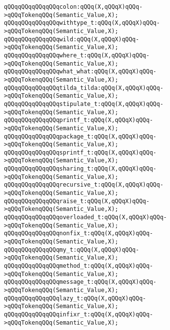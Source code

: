 \verb|qQQqqQQqqQQqqQQqcolon:qQQq(X,qQQqX)qQQq->qQQqTokenqQQq(Semantic_Value,X);|\newline
\verb|qQQqqQQqqQQqqQQqwithtype_t:qQQq(X,qQQqX)qQQq->qQQqTokenqQQq(Semantic_Value,X);|\newline
\verb|qQQqqQQqqQQqqQQqwild:qQQq(X,qQQqX)qQQq->qQQqTokenqQQq(Semantic_Value,X);|\newline
\verb|qQQqqQQqqQQqqQQqwhere_t:qQQq(X,qQQqX)qQQq->qQQqTokenqQQq(Semantic_Value,X);|\newline
\verb|qQQqqQQqqQQqqQQqwhat_what:qQQq(X,qQQqX)qQQq->qQQqTokenqQQq(Semantic_Value,X);|\newline
\verb|qQQqqQQqqQQqqQQqtilda_tilda:qQQq(X,qQQqX)qQQq->qQQqTokenqQQq(Semantic_Value,X);|\newline
\verb|qQQqqQQqqQQqqQQqstipulate_t:qQQq(X,qQQqX)qQQq->qQQqTokenqQQq(Semantic_Value,X);|\newline
\verb|qQQqqQQqqQQqqQQqprintf_t:qQQq(X,qQQqX)qQQq->qQQqTokenqQQq(Semantic_Value,X);|\newline
\verb|qQQqqQQqqQQqqQQqpackage_t:qQQq(X,qQQqX)qQQq->qQQqTokenqQQq(Semantic_Value,X);|\newline
\verb|qQQqqQQqqQQqqQQqsprintf_t:qQQq(X,qQQqX)qQQq->qQQqTokenqQQq(Semantic_Value,X);|\newline
\verb|qQQqqQQqqQQqqQQqsharing_t:qQQq(X,qQQqX)qQQq->qQQqTokenqQQq(Semantic_Value,X);|\newline
\verb|qQQqqQQqqQQqqQQqrecursive_t:qQQq(X,qQQqX)qQQq->qQQqTokenqQQq(Semantic_Value,X);|\newline
\verb|qQQqqQQqqQQqqQQqraise_t:qQQq(X,qQQqX)qQQq->qQQqTokenqQQq(Semantic_Value,X);|\newline
\verb|qQQqqQQqqQQqqQQqoverloaded_t:qQQq(X,qQQqX)qQQq->qQQqTokenqQQq(Semantic_Value,X);|\newline
\verb|qQQqqQQqqQQqqQQqnonfix_t:qQQq(X,qQQqX)qQQq->qQQqTokenqQQq(Semantic_Value,X);|\newline
\verb|qQQqqQQqqQQqqQQqmy_t:qQQq(X,qQQqX)qQQq->qQQqTokenqQQq(Semantic_Value,X);|\newline
\verb|qQQqqQQqqQQqqQQqmethod_t:qQQq(X,qQQqX)qQQq->qQQqTokenqQQq(Semantic_Value,X);|\newline
\verb|qQQqqQQqqQQqqQQqmessage_t:qQQq(X,qQQqX)qQQq->qQQqTokenqQQq(Semantic_Value,X);|\newline
\verb|qQQqqQQqqQQqqQQqlazy_t:qQQq(X,qQQqX)qQQq->qQQqTokenqQQq(Semantic_Value,X);|\newline
\verb|qQQqqQQqqQQqqQQqinfixr_t:qQQq(X,qQQqX)qQQq->qQQqTokenqQQq(Semantic_Value,X);|\newline
